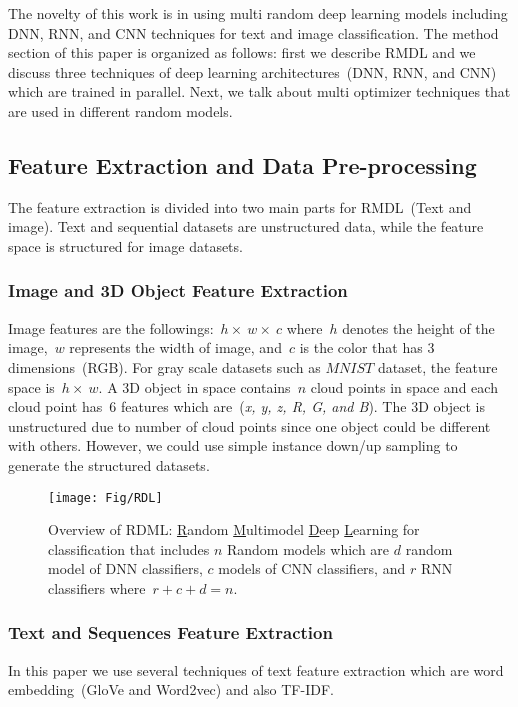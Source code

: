 \documentclass[sigconf, final]{acmart}
\begin{document}
The novelty of this work is in using multi random deep learning models including DNN, RNN, and CNN techniques for text and image classification. The method section of this paper is organized as follows: first we describe RMDL and we discuss three techniques of deep learning architectures~(DNN, RNN, and CNN) which are trained in parallel. Next, we talk about multi optimizer techniques that are used in different random models. 
\subsection{Feature Extraction and Data Pre-processing}\label{subsect:Feature}
The feature extraction is divided into two main parts for RMDL~(Text and image). Text and sequential datasets are unstructured data, while the feature space is structured for image datasets.
\subsubsection{Image and 3D Object Feature Extraction}
Image features are the followings:~$h\times~w\times~c$ where~$h$ denotes the height of the image,~$w$ represents the width of image, and~$c$ is the color that has 3 dimensions~(RGB). For gray scale datasets such as $MNIST$ dataset, the feature space is~$h\times~w$. A 3D object in space contains~$n$ cloud points in space and each cloud point has~$6$ features which are~(\textit{x, y, z, R, G, and B}). The 3D object is unstructured due to number of cloud points since one object could be different with others. However, we could use simple instance down/up sampling to generate the structured datasets.
\begin{figure*}[t]
\centering
\texttt{[image: Fig/RDL]}

\caption{Overview of RDML: \underline{R}andom \underline{M}ultimodel \underline{D}eep \underline{L}earning for classification that includes $n$ Random models which are $d$ random model of DNN classifiers, $c$ models of CNN classifiers, and $r$ RNN classifiers where~$r+c+d=n$.}\label{Fig_RMDL}
\vspace{-0.15in}

\end{figure*}\subsubsection{Text and Sequences Feature Extraction}
In this paper we use several techniques of text feature extraction which are word embedding~(GloVe and Word2vec) and also TF-IDF. 
\end{document}
